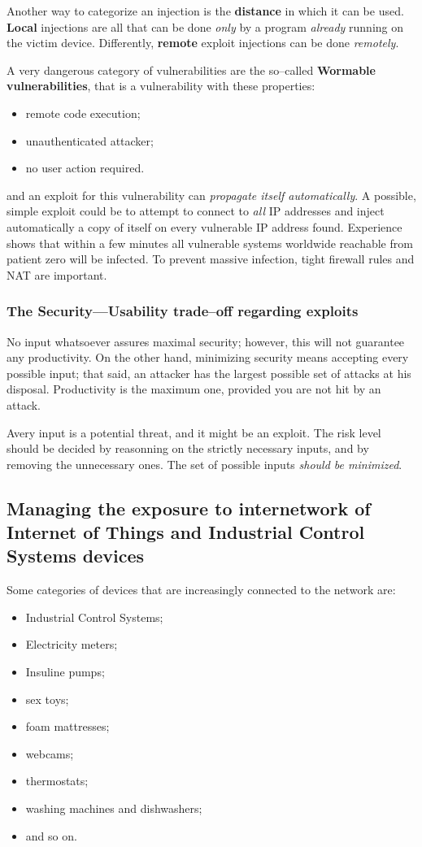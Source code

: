 \documentclass[10pt]{extbook}
\begin{document}
Another way to categorize an injection is the \textbf{distance} in which it can
be used. \textbf{Local} injections are all that can be done \emph{only} by a
program \emph{already} running on the victim device. Differently,
\textbf{remote} exploit injections can be done \emph{remotely}.

A very dangerous category of vulnerabilities are the so--called
\textbf{Wormable vulnerabilities}, that is a vulnerability with these
properties:
\begin{itemize}
    \item remote code execution;
    \item unauthenticated attacker;
    \item no user action required.
\end{itemize}
and an exploit for this vulnerability can \emph{propagate itself
automatically}. A possible, simple exploit could be to attempt to connect to
\emph{all} IP addresses and inject automatically a copy of itself on every
vulnerable IP address found. Experience shows that within a few minutes all
vulnerable systems worldwide reachable from patient zero will be infected. To
prevent massive infection, tight firewall rules and NAT are important.

\subsubsection{The Security---Usability trade--off regarding exploits}

No input whatsoever assures maximal security;  however, this will not
guarantee any productivity. On the other hand, minimizing security means
accepting every possible input; that said, an attacker has the largest possible
set of attacks at his disposal. Productivity is the maximum one, provided you
are not hit by an attack.

Avery input is a potential threat, and it might be an exploit. The risk level
should be decided by reasonning on the strictly necessary inputs, and by
removing the unnecessary ones. The set of possible inputs \emph{should be
minimized}.

\subsection{Managing the exposure to internetwork of Internet of Things and Industrial Control Systems devices}

Some categories of devices that are increasingly connected to the network are:
\begin{itemize}
    \item Industrial Control Systems;
    \item Electricity meters;
    \item Insuline pumps;
    \item sex toys;
    \item foam mattresses;
    \item webcams;
    \item thermostats;
    \item washing machines and dishwashers;
    \item and so on.
\end{itemize}
\end{document}
